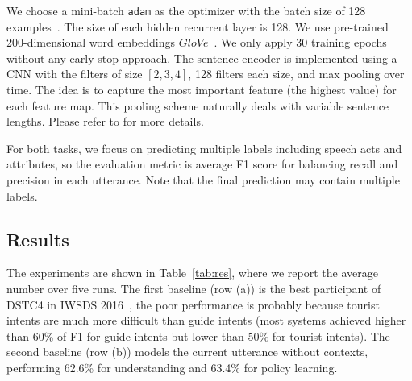 \documentclass[11pt,letterpaper]{article}
\begin{document}
We choose a mini-batch \texttt{adam} as the optimizer with the batch size of 128 examples~\cite{kingma2014adam}.
The size of each hidden recurrent layer is 128.
We use pre-trained 200-dimensional word embeddings $GloVe$~\cite{pennington2014glove}.
We only apply 30 training epochs without any early stop approach. 
The sentence encoder is implemented using a CNN with the filters of size $[2, 3, 4]$, 128 filters each size, and max pooling over time.
The idea is to capture the most important feature (the highest value) for
each feature map. This pooling scheme naturally
deals with variable sentence lengths. Please refer to  for more details.

For both tasks, we focus on predicting multiple labels including speech acts and attributes, so the evaluation metric is average F1 score for balancing recall and precision in each utterance.
Note that the final prediction may contain multiple labels.

\subsection{Results}


The experiments are shown in Table~\ref{tab:res}, where we report the average number over five runs.
The first baseline (row (a)) is the best participant of DSTC4 in IWSDS 2016~\cite{kim2016fourth}, the poor performance is probably because tourist intents are much more difficult than guide intents (most systems achieved higher than 60\% of F1 for guide intents but lower than 50\% for tourist intents).
The second baseline (row (b)) models the current utterance without contexts, performing 62.6\% for understanding and 63.4\% for policy learning.
\end{document}
